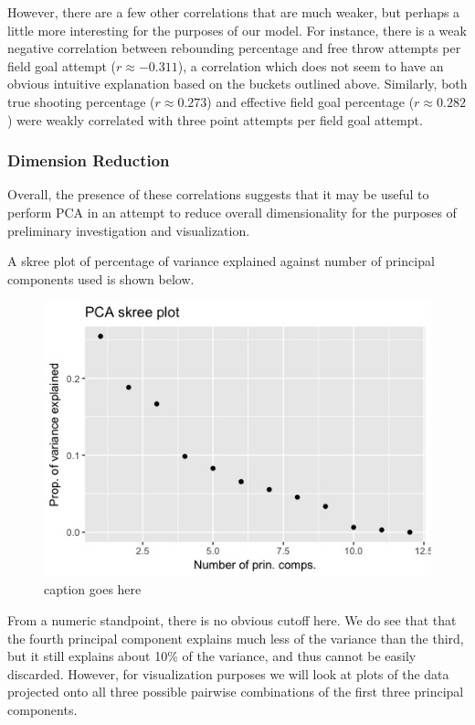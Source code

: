 \documentclass[10pt,a4paper, hidelinks]{article} %
\begin{document}
However, there are a few other correlations that are much weaker, but perhaps a little more interesting for the purposes of our model. For instance, there is a weak negative correlation between rebounding percentage and free throw attempts per field goal attempt ($r \approx -0.311$), a correlation which does not seem to have an obvious intuitive explanation based on the buckets outlined above. Similarly, both true shooting percentage ($r \approx 0.273$) and effective field goal percentage ($r \approx 0.282$) were weakly correlated with three point attempts per field goal attempt.

\subsubsection{Dimension Reduction}

Overall, the presence of these correlations suggests that it may be useful to perform PCA in an attempt to reduce overall dimensionality for the purposes of preliminary investigation and visualization.

A skree plot of percentage of variance explained against number of principal components used is shown below. 

\begin{figure}[H]
	\centering
	\includegraphics[width=0.7\linewidth]{../fig/Skreeeeee}
	\caption{caption goes here}
	\label{fig:Skreeeeee}
\end{figure}

From a numeric standpoint, there is no obvious cutoff here. We do see that that the fourth principal component explains much less of the variance than the third, but it still explains about 10\% of the variance, and thus cannot be easily discarded. However, for visualization purposes we will look at plots of the data projected onto all three possible pairwise combinations of the first three principal components.
\end{document}
